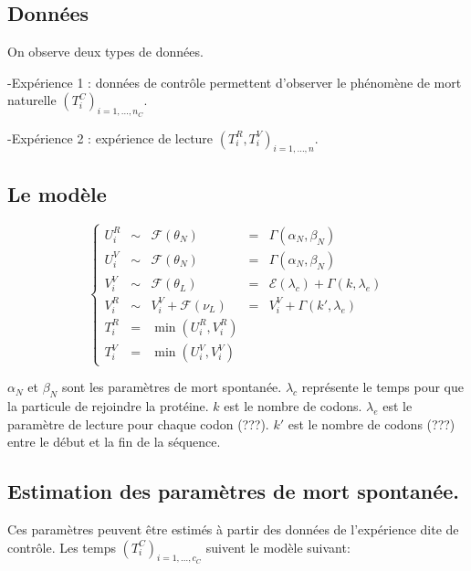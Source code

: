 \documentclass[
  letterpaper,
  DIV=11,
  numbers=noendperiod]{scrartcl}
\begin{document}
\hypertarget{donnuxe9es}{%
\subsection{Données}\label{donnuxe9es}}

On observe deux types de données.

-Expérience 1 : données de contrôle permettent d'observer le phénomène
de mort naturelle \((T_i^{C})_{i=1, \dots,n_C}\).

-Expérience 2 : expérience de lecture
\((T_i^{R}, T_i^V)_{i=1, \dots,n}\).

\hypertarget{le-moduxe8le}{%
\subsection{Le modèle}\label{le-moduxe8le}}

\[
\left\{
\begin{array}{cclcl}
U_i^R &\sim&   \mathcal{F}(\theta_{N}) &=& \Gamma(\alpha_N,\beta_N)\\
U_i^V &\sim&   \mathcal{F}(\theta_{N}) &=& \Gamma(\alpha_N,\beta_N) \\
V_i^V  &\sim&    \mathcal{F}(\theta_{L}) &=& \mathcal{E}(\lambda_c) + \Gamma(k, \lambda_e)  \\
V_i^R  &\sim&  V_i^V + \mathcal{F}(\nu_{L}) &=& V_i^V + \Gamma(k', \lambda_e)  \\
T_i^{R} &=&  \min(U_i^{R},V_i^R)\\
T_i^{V} &=& \min(U_i^{V},V_i^V)
\end{array}
\right.
\]

\(\alpha_N\) et \(\beta_N\) sont les paramètres de mort spontanée.
\(\lambda_c\) représente le temps pour que la particule de rejoindre la
protéine. \(k\) est le nombre de codons. \(\lambda_e\) est le paramètre
de lecture pour chaque codon (???). \(k'\) est le nombre de codons (???)
entre le début et la fin de la séquence.

\hypertarget{estimation-des-paramuxe8tres-de-mort-spontanuxe9e.}{%
\subsection{Estimation des paramètres de mort
spontanée.}\label{estimation-des-paramuxe8tres-de-mort-spontanuxe9e.}}

Ces paramètres peuvent être estimés à partir des données de l'expérience
dite de contrôle. Les temps \((T_i^C)_{i=1,\dots,c_C}\) suivent le
modèle suivant:
\end{document}
